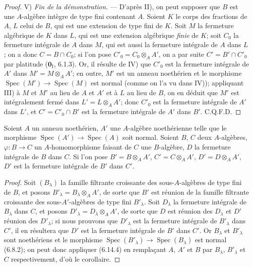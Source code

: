 \begin{proof}
V) \emph{Fin de la démonstration.} --- D'après II), on peut supposer que
$B$ est une $A$-algèbre intègre de type fini contenant $A$. Soient $K$ le
corps des fractions de $A$, $L$ celui de $B$, qui est une extension de type
fini de $K$. Soit $M$ la fermeture algébrique de $K$ dans $L$, qui est une
extension algébrique \emph{finie} de $K$; soit $C_0$ la fermeture intégrale de $A$
dans $M$, qui est aussi la fermeture intégrale de $A$ dans $L$; on a donc
$C=B\cap C_0$; si l'on pose $C'_0=C_0\otimes_A A'$, on a par suite
$C'=B'\cap C'_0$ par platitude ($\mathbf{0}_{\mathrm I}$, 6.1.3). Or, il résulte de
IV) que $C'_0$ est la fermeture intégrale de $A'$ dans
$M'=M\otimes_A A'$; en outre, $M'$ est un anneau noethérien et le morphisme
$\operatorname{Spec}(M')\to\operatorname{Spec}(M)$ est normal (comme on
l'a vu dans IV)); appliquant III) à $M$ et $M'$ au lieu de $A$ et $A'$ et
à $L$ au lieu de $B$, on en déduit que $M'$ est intégralement fermé dans
$L'=L\otimes_A A'$; donc $C'_0$ est la fermeture intégrale de $A'$ dans
$L'$, et $C'=C'_0\cap B'$ est la fermeture intégrale de $A'$ dans $B'$.
C.Q.F.D.
\end{proof}

\begin{corollary}[6.14.5]
\label{IV.2.s6.14.5-fr}
Soient $A$ un anneau noethérien, $A'$ une $A$-algèbre noethérienne telle
que le morphisme $\operatorname{Spec}(A')\to\operatorname{Spec}(A)$ soit
normal. Soient $B$, $C$ deux $A$-algèbres,
$\varphi:B\to C$ un $A$-homomorphisme faisant de $C$ une $B$-algèbre, $D$
la fermeture intégrale de $B$ dans $C$. Si l'on pose
$B'=B\otimes_A A'$, $C'=C\otimes_A A'$, $D'=D\otimes_A A'$, $D'$ est la
fermeture intégrale de $B'$ dans $C'$.
\end{corollary}

\begin{proof}
Soit $(B_\lambda)$ la famille filtrante croissante des sous-$A$-algèbres
de type fini de $B$, et posons $B'_\lambda=B_\lambda\otimes_A A'$, de
sorte que $B'$ est réunion de la famille filtrante croissante des
sous-$A'$-algèbres de type fini $B'_\lambda$. Soit $D_\lambda$ la
fermeture intégrale de $B_\lambda$ dans $C$, et posons
$D'_\lambda=D_\lambda\otimes_A A'$, de sorte que $D$ est réunion des
$D_\lambda$ et $D'$ réunion des $D'_\lambda$; si nous prouvons que
$D'_\lambda$ est la fermeture intégrale de $B'_\lambda$ dans $C'$, il en
résultera que $D'$ est la fermeture intégrale de $B'$ dans $C'$. Or
$B_\lambda$ et $B'_\lambda$ sont noethériens et le morphisme
$\operatorname{Spec}(B'_\lambda)\to\operatorname{Spec}(B_\lambda)$ est
normal (6.8.2); on peut donc appliquer (6.14.4) en remplaçant $A$, $A'$ et
$B$ par $B_\lambda$, $B'_\lambda$ et $C$ respectivement, d'où le
corollaire.
\end{proof}

